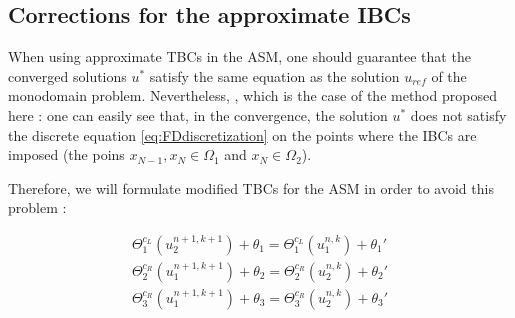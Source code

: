 \endgroup


\subsection{Corrections for the approximate IBCs}

\indent When using approximate TBCs in the ASM, one should guarantee that the converged solutions $u^*$ satisfy the same equation as the solution $u_{ref}$ of the monodomain problem. Nevertheless, \begingroup \color{red}{usually this property is not verified by DDMs} \endgroup, which is the case of the method proposed here : one can easily see that, in the convergence, the solution $u^*$ does not satisfy the discrete equation \eqref{eq:FDdiscretization} on the points where the IBCs are imposed (the poins $x_{N-1},x_N \in \Omega_1$ and $x_N \in \Omega_2$).

\indent Therefore, we will formulate modified TBCs for the ASM in order to avoid this problem  :

\begin{equation}
	\label{eq:correctedTBC}
    \begin{gathered}
        \Theta_1^{c_L}(u_2^{n+1,k+1}) + \theta_1 = \Theta_1^{c_L}(u_1^{n,k}) + \theta_1' \\
        \Theta_2^{c_R}(u_1^{n+1,k+1}) + \theta_2 = \Theta_2^{c_R}(u_2^{n,k}) + \theta_2' \\
        \Theta_3^{c_R}(u_1^{n+1,k+1}) + \theta_3 = \Theta_3^{c_R}(u_2^{n,k}) + \theta_3'
    \end{gathered}
\end{equation}

